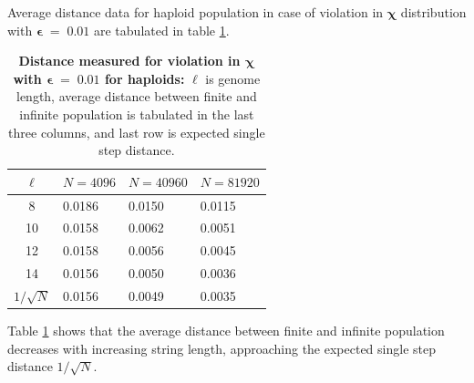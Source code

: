 \clearpage
Average distance data for haploid population in case of violation in $\bm{\chi}$ distribution 
with $\bm{\epsilon} \;=\; 0.01$ are tabulated in table \ref{distanceChiHapEps0.01}.
\begin{table}[ht]
\caption[\textbf{Distance measured for violation in $\bm{\chi}$ with $\bm{\epsilon} \;=\; 0.01$  for haploids}]{\textbf{Distance measured for violation in $\bm{\chi}$ with $\bm{\epsilon} \;=\; 0.01$  for haploids:} $\ell$ is genome length, 
average distance between finite and infinite population is tabulated in the last three columns, and last row is expected single step distance.}
\centering
\begin{tabularx}{0.75\textwidth}{ c *{3}{X}}
\toprule
$\ell$ & $N = 4096$ & $N = 40960$ & $N = 81920$  \\
\midrule
8 & 0.0186	&  0.0150 	& 0.0115 \\
10 & 0.0158	&  0.0062 	& 0.0051 \\ 
12 & 0.0158	&  0.0056	& 0.0045 \\
14 & 0.0156	&  0.0050	& 0.0036 \\ 
\midrule
$1/\sqrt{N}$ & 0.0156 & 0.0049 & 0.0035 \\
\bottomrule
\end{tabularx}
\label{distanceChiHapEps0.01}
\end{table} 

Table \ref{distanceChiHapEps0.01} shows that the average distance 
between finite and infinite population decreases with increasing string length, approaching the expected single step distance 
$1/\sqrt{N}$. 